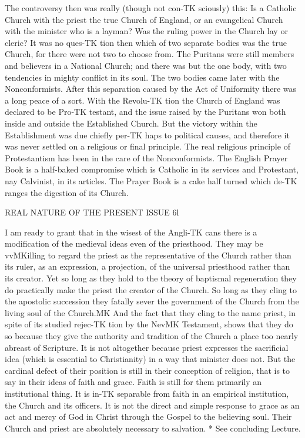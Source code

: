 \documentclass[12pt,a5paper,oneside]{book}
\begin{document}
The controversy then was really (though not con-TK
sciously) this: Is a Catholic Church with the priest 
the true Church of England, or an evangelical Church 
with the minister who is a layman? Was the ruling 
power in the Church lay or cleric? It was no ques-TK
tion then which of two separate bodies was the true 
Church, for there were not two to choose from. 
The Puritans were still members and believers in a 
National Church; and there was but the one body, 
with two tendencies in mighty conflict in its soul. 
The two bodies came later with the Nonconformists. 
After this separation caused by the Act of Uniformity 
there was a long peace of a sort. With the Revolu-TK
tion the Church of England was declared to be Pro-TK
testant, and the issue raised by the Puritans won both 
inside and outside the Established Church. But the 
victory within the Establishment was due chiefly per-TK
haps to political causes, and therefore it was never 
settled on a religious or final principle. The real 
religious principle of Protestantism has been in the 
care of the Nonconformists. The English Prayer 
Book is a half-baked compromise which is Catholic in 
its services and Protestant, nay Calvinist, in its articles. 
The Prayer Book is a cake half turned which de-TK
ranges the digestion of its Church. 



REAL NATURE OF THE PRESENT ISSUE 6l 

I am ready to grant that in the wisest of the Angli-TK
cans there is a modification of the medieval ideas even 
of the priesthood. They may be vvMKilling to regard the 
priest as the representative of the Church rather than 
its ruler, as an expression, a projection, of the universal 
priesthood rather than its creator. Yet so long as they 
hold to the theory of baptismal regeneration they do 
practically make the priest the creator of the Church. 
So long as they cling to the apostolic succession they 
fatally sever the government of the Church from the 
living soul of the Church.MK And the fact that they 
cling to the name priest, in spite of its studied rejec-TK
tion by the NevMK Testament, shows that they do so 
because they give the authority and tradition of the 
Church a place too nearly abreast of Scripture. It is 
not altogether because priest expresses the sacrificial 
idea (which is essential to Christianity) in a way that 
minister does not. But the cardinal defect of their 
position is still in their conception of religion, that is 
to say in their ideas of faith and grace. Faith is still 
for them primarily an institutional thing. It is in-TK
separable from faith in an empirical institution, the 
Church and its officers. It is not the direct and simple 
response to grace as an act and mercy of God in Christ 
through the Gospel to the believing soul. Their 
Church and priest are absolutely necessary to salvation. 
* See concluding Lecture. 
\end{document}
